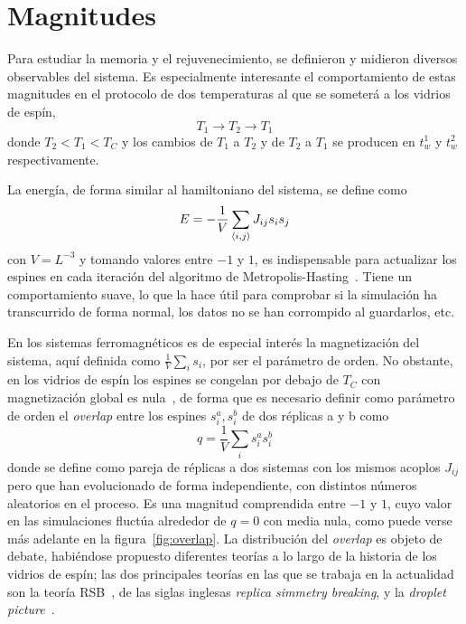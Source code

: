 \documentclass[11pt]{report}
\newcommand{\sub}[1]{ _{{\scriptscriptstyle \mathit{#1}}}  }
\begin{document}
\section{Magnitudes}

Para estudiar la memoria y el rejuvenecimiento, se definieron y
midieron diversos observables del sistema. Es especialmente
interesante el comportamiento de estas magnitudes en el protocolo
de dos temperaturas al que se someterá a los vidrios de espín,
\begin{equation*}
  T_1 → T_2 → T_1
\end{equation*}
donde $T_2<T_1<T\sub{C}$ y los cambios de $T_1$ a $T_2$ y de $T_2$ a
$T_1$ se producen en $t_w^1$ y $t_w^2$ respectivamente.

La energía, de forma similar al hamiltoniano del sistema, se define como
\begin{equation}
  E = - \frac{1}{V} \sum_{\expval{i,j}}  J_{ij} s_i s_j
\end{equation}
con $V=L^{-3}$ y tomando valores entre $-1$ y $1$, es indispensable
para actualizar los espines en cada iteración del algoritmo de
Metropolis-Hasting~\cite{metropolis}. Tiene un comportamiento suave,
lo que la hace útil para comprobar si la simulación ha transcurrido de
forma normal, los datos no se han corrompido al guardarlos, etc.

En los sistemas ferromagnéticos es de especial interés la
magnetización del sistema, aquí definida como
$\frac{1}{V}\sum_{i}s_i$, por ser el parámetro de orden. No obstante,
en los vidrios de espín los espines se congelan por debajo de
$T\sub{C}$ con magnetización global es nula~\cite{binder}, de forma
que es necesario definir como parámetro de orden el \textit{overlap}
entre los espines $s^a_i, s_i^b$ de dos réplicas a y b como
\begin{equation}
  q = \frac{1}{V} \sum_{i} s^a_i s_i^b
\end{equation}
donde se define como pareja de réplicas a dos sistemas con los mismos
acoplos $J_{ij}$ pero que han evolucionado de forma independiente, con
distintos números aleatorios en el proceso. Es una magnitud
comprendida entre $-1$ y $1$, cuyo valor en las simulaciones fluctúa
alrededor de $q=0$ con media nula, como puede verse más adelante en la
figura~\ref{fig:overlap}. La distribución del \textit{overlap} es
objeto de debate, habiéndose propuesto diferentes teorías a lo largo
de la historia de los vidrios de espín; las dos principales teorías en
las que se trabaja en la actualidad son la teoría
RSB~\cite{Marinari2000}\cite{mezard1987spin}, de las siglas inglesas
\textit{replica simmetry breaking}, y la \textit{droplet
  picture}~\cite{cmonman}.
\end{document}
